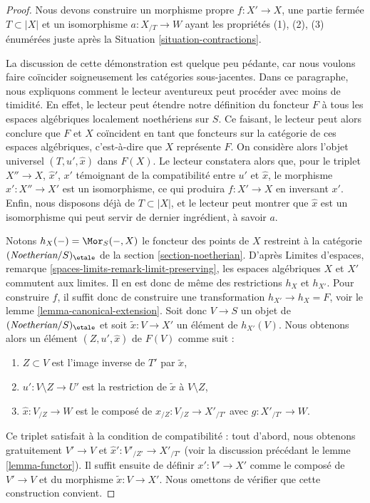 \begin{proof}
Nous devons construire un morphisme propre $f : X' \to X$, une partie fermée
$T \subset |X|$ et un isomorphisme $a : X_{/T} \to W$ ayant les propriétés
(1), (2), (3) énumérées juste après la Situation \ref{situation-contractions}.

\medskip\noindent
La discussion de cette démonstration est quelque peu pédante, car nous voulons
faire coïncider soigneusement les catégories sous-jacentes. Dans ce paragraphe,
nous expliquons comment le lecteur aventureux peut procéder avec moins de timidité.
En effet, le lecteur peut étendre notre définition du foncteur $F$
à tous les espaces algébriques localement noethériens sur $S$.
Ce faisant, le lecteur peut alors conclure que $F$ et $X$ coïncident en tant que
foncteurs sur la catégorie de ces espaces algébriques, c'est-à-dire que
$X$ représente $F$. On considère alors l'objet universel
$(T, u', \hat x)$ dans $F(X)$. Le lecteur constatera alors que,
pour le triplet $X'' \to X$, $\hat x'$, $x'$ témoignant de la compatibilité
entre $u'$ et $\hat x$, le morphisme $x' : X'' \to X'$ est un isomorphisme,
ce qui produira $f : X' \to X$ en inversant $x'$. Enfin, nous disposons déjà de
$T \subset |X|$, et le lecteur peut montrer que $\hat x$ est un isomorphisme
qui peut servir de dernier ingrédient, à savoir $a$.

\medskip\noindent
Notons $h_X(-) = \Mor_S(-, X)$ le foncteur des
points de $X$ restreint à la catégorie
$(\textit{Noetherian}/S)_\etale$ de la section \ref{section-noetherian}.
D'après Limites d'espaces, remarque \ref{spaces-limits-remark-limit-preserving},
les espaces algébriques $X$ et $X'$ commutent aux limites. Il en est donc de même
des restrictions $h_X$ et $h_{X'}$.
Pour construire $f$, il suffit donc de construire une
transformation $h_{X'} \to h_X = F$, voir le lemme \ref{lemma-canonical-extension}.
Soit donc $V \to S$ un objet de $(\textit{Noetherian}/S)_\etale$
et soit $\tilde x : V \to X'$ un élément de $h_{X'}(V)$.
Nous obtenons alors un élément $(Z, u', \hat x)$ de $F(V)$ comme suit :
\begin{enumerate}
\item $Z \subset V$ est l'image inverse de $T'$ par $\tilde x$,
\item $u' : V \setminus Z \to U'$ est la restriction de
$\tilde x$ à $V \setminus Z$,
\item $\hat x : V_{/Z} \to W$ est le composé de
$x_{/Z} : V_{/Z} \to X'_{/T'}$ avec $g : X'_{/T'} \to W$.
\end{enumerate}
Ce triplet satisfait à la condition de compatibilité : tout d'abord, nous
obtenons gratuitement $V' \to V$ et $\hat x' : V'_{/Z'} \to X'_{/T'}$
(voir la discussion précédant le lemme \ref{lemma-functor}).
Il suffit ensuite de définir $x' : V' \to X'$ comme le composé
de $V' \to V$ et du morphisme $\tilde x : V \to X'$.
Nous omettons de vérifier que cette construction convient.


\end{proof}
